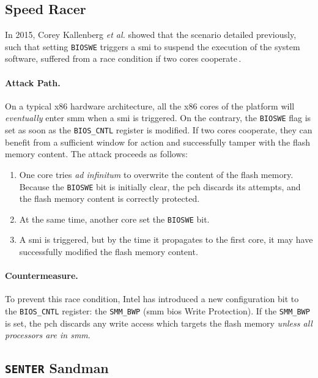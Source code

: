 \subsection{Speed Racer}
\label{subsec:usecase:hse:speed}

In 2015, Corey Kallenberg \emph{et al.} showed that the scenario detailed
previously, such that setting \texttt{BIOSWE} triggers a \ac{smi} to suspend the
execution of the system software, suffered from a race condition if two cores
cooperate\,\cite{kallenberg2015racecondition}.

\paragraph{Attack Path.}
%
On a typical x86 hardware architecture, all the x86 cores of the platform will
\emph{eventually} enter \ac{smm} when a \ac{smi} is triggered.
%
On the contrary, the \texttt{BIOSWE} flag is set as soon as the
\texttt{BIOS\_CNTL} register is modified.
%
If two cores cooperate, they can benefit from a sufficient window for action and
successfully tamper with the flash memory content.
%
The attack proceeds as follows:

\begin{enumerate}
\item One core tries \emph{ad infinitum} to overwrite the content of the flash
  memory.
  Because the \texttt{BIOSWE} bit is initially clear, the \ac{pch} discards its
  attempts, and the flash memory content is correctly protected.
%
\item At the same time, another core set the \texttt{BIOSWE} bit.
%
\item A \ac{smi} is triggered, but by the time it propagates to the first core,
  it may have successfully modified the flash memory content.
%
\end{enumerate}

\paragraph{Countermeasure.}
%
To prevent this race condition, Intel has introduced a new configuration bit to
the \texttt{BIOS\_CNTL} register: the \texttt{SMM\_BWP} (\ac{smm} \ac{bios}
Write Protection).
%
If the \texttt{SMM\_BWP} is set, the \ac{pch} discards any write access which
targets the flash memory \emph{unless all processors are in \ac{smm}}.

\subsection{\texttt{SENTER} Sandman}
\label{subsec:usecase:hse:sandman}

